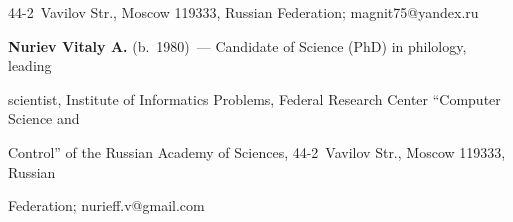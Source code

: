 44-2~Vavilov Str., Moscow 119333, Russian Federation; \mbox{magnit75@yandex.ru}








\vspace*{3pt}





\noindent


\textbf{Nuriev Vitaly A.} (b.\ 1980)~--- Candidate of Science (PhD) in philology, leading 


scientist, Institute of Informatics Problems, Federal Research Center ``Computer Science and 


Control'' of the Russian Academy of Sciences, 44-2~Vavilov Str., Moscow 119333, Russian 


Federation; \mbox{nurieff.v@gmail.com}








   





\label{end\stat}





\renewcommand{\bibname}{\protect\rm Литература} 


